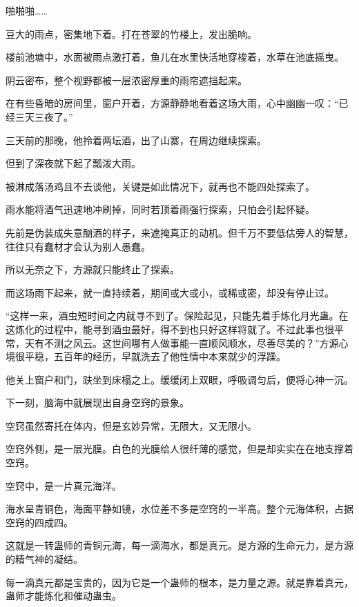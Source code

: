 
\begin{this_body}



啪啪啪……

豆大的雨点，密集地下着。打在苍翠的竹楼上，发出脆响。

楼前池塘中，水面被雨点激打着，鱼儿在水里快活地穿梭着，水草在池底摇曳。

阴云密布，整个视野都被一层浓密厚重的雨帘遮挡起来。

在有些昏暗的房间里，窗户开着，方源静静地看着这场大雨，心中幽幽一叹：“已经三天三夜了。”

三天前的那晚，他拎着两坛酒，出了山寨，在周边继续探索。

但到了深夜就下起了瓢泼大雨。

被淋成落汤鸡且不去谈他，关键是如此情况下，就再也不能四处探索了。

雨水能将酒气迅速地冲刷掉，同时若顶着雨强行探索，只怕会引起怀疑。

先前是伪装成失意酗酒的样子，来遮掩真正的动机。但千万不要低估旁人的智慧，往往只有蠢材才会认为别人愚蠢。

所以无奈之下，方源就只能终止了探索。

而这场雨下起来，就一直持续着，期间或大或小，或稀或密，却没有停止过。

“这样一来，酒虫短时间之内就寻不到了。保险起见，只能先着手炼化月光蛊。在这炼化的过程中，能寻到酒虫最好，得不到也只好这样将就了。不过此事也很平常，天有不测之风云。这世间哪有人做事能一直顺风顺水，尽善尽美的？”方源心境很平稳，五百年的经历，早就洗去了他性情中本来就少的浮躁。

他关上窗户和门，趺坐到床榻之上。缓缓闭上双眼，呼吸调匀后，便将心神一沉。

下一刻，脑海中就展现出自身空窍的景象。

空窍虽然寄托在体内，但是玄妙异常，无限大，又无限小。

空窍外侧，是一层光膜。白色的光膜给人很纤薄的感觉，但是却实实在在地支撑着空窍。

空窍中，是一片真元海洋。

海水呈青铜色，海面平静如镜，水位差不多是空窍的一半高。整个元海体积，占据空窍的四成四。

这就是一转蛊师的青铜元海，每一滴海水，都是真元。是方源的生命元力，是方源的精气神的凝结。

每一滴真元都是宝贵的，因为它是一个蛊师的根本，是力量之源。就是靠着真元，蛊师才能炼化和催动蛊虫。


\end{this_body}
